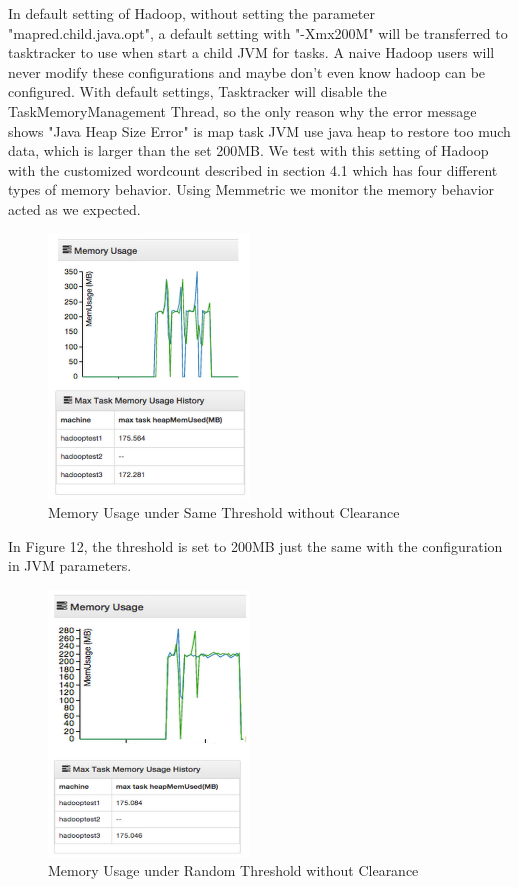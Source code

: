 In default setting of Hadoop, without setting the parameter "mapred.child.java.opt", a default setting with "-Xmx200M" will be transferred to tasktracker to use when start a child JVM for tasks. A naive Hadoop users will never modify these configurations and maybe don't even know hadoop can be configured.
With default settings, Tasktracker will disable the TaskMemoryManagement Thread, so the only reason why the error message shows "Java Heap Size Error" is map task JVM use java heap to restore too much data, which is larger than the set 200MB.
We test with this setting of Hadoop with the customized wordcount described in section 4.1 which has four different types of memory behavior. Using Memmetric we monitor the memory behavior acted as we expected.

\begin{figure}[ht]
  \centering
    \includegraphics[width=2.1in]{image/test1a.png}
    \caption{Memory Usage under Same Threshold without Clearance}
    \label{ref:memory_allocation}
\end{figure}

In Figure 12, the threshold is set to 200MB just the same with the configuration in JVM parameters. 

\begin{figure}[ht]
  \centering
    \includegraphics[width=2.1in]{image/test1b.png}
    \caption{Memory Usage under Random Threshold without Clearance}
    \label{ref:memory_allocation}
\end{figure}

